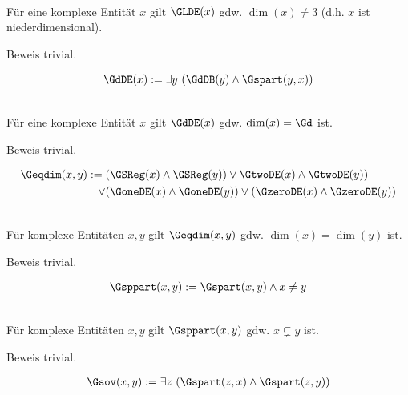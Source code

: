 \begin{satz}\ \\
    Für eine komplexe Entität $x$ gilt $\GLDE(x)$ gdw. $\dim(x) \neq 3$ (d.h. $x$ ist niederdimensional).
\end{satz}
Beweis trivial.


\begin{erin}
    \begin{align*}
        \GdDE(x) := \exists y\ (\GdDB(y) \wedge \Gspart(y, x))
    \end{align*}
\end{erin}

\begin{satz}\ \\
    Für eine komplexe Entität $x$ gilt $\GdDE(x)$ gdw. $\dim(x) = \Gd$ ist.
\end{satz}
Beweis trivial.


\begin{erin}
    \begin{align*}
        \Geqdim(x,y) := (&\GSReg(x) \wedge \GSReg(y)) \vee \GtwoDE(x) \wedge \GtwoDE(y))\\ \vee (&\GoneDE(x) \wedge \GoneDE(y)) \vee (\GzeroDE(x) \wedge \GzeroDE(y))
    \end{align*}
\end{erin}

\begin{satz}\ \\
    Für komplexe Entitäten $x,y$ gilt $\Geqdim(x,y)$ gdw. $\dim(x) = \dim(y)$ ist.
\end{satz}
Beweis trivial.


\begin{erin}
    \begin{align*}
        \Gsppart(x, y) := \Gspart(x, y) \land  x \neq y
    \end{align*}
\end{erin}

\begin{satz}\ \\
    Für komplexe Entitäten $x,y$ gilt $\Gsppart(x,y)$ gdw. $x \subsetneq y$ ist.
\end{satz}
Beweis trivial.


\begin{erin}
    \begin{align*}
        \Gsov(x, y) := \exists z\  (\Gspart(z, x) \wedge \Gspart(z, y))
    \end{align*}
\end{erin}


